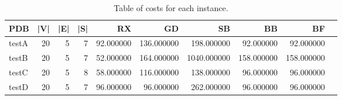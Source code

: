 \begin{table}
\caption{Table of costs for each instance.}
\label{tab:costs}
\begin{tabular}{lrrrrrrrrr}
\toprule
PDB & |V| & |E| & |S| & RX & GD & SB & BB & BF \\
\midrule
testA & 20 & 5 & 7 & 92.000000 & 136.000000 & 198.000000 & 92.000000 & 92.000000 \\
testB & 20 & 5 & 7 & 52.000000 & 164.000000 & 1040.000000 & 158.000000 & 158.000000 \\
testC & 20 & 5 & 8 & 58.000000 & 116.000000 & 138.000000 & 96.000000 & 96.000000 \\
testD & 20 & 5 & 7 & 96.000000 & 96.000000 & 262.000000 & 96.000000 & 96.000000 \\
\bottomrule
\end{tabular}
\end{table}
